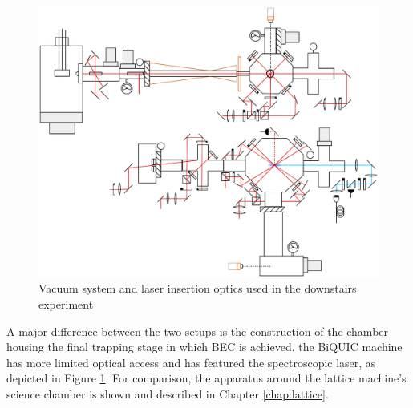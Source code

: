 	\begin{figure}
		\centering
		\includegraphics[width=\textwidth]{fig/apparatus/vacuum_schematic}
		\caption{Vacuum system and laser insertion optics used in the downstairs experiment }
		\label{fig:vacuum_diagram}
	\end{figure}
	


	A major difference between the two setups is the construction of the chamber housing the final trapping stage in which BEC is achieved. the BiQUIC machine has more limited optical access and has featured the spectroscopic laser, as depicted in Figure \ref{fig:vacuum_diagram}. For comparison, the apparatus around the lattice machine's science chamber is shown and described in Chapter \ref{chap:lattice}. 


